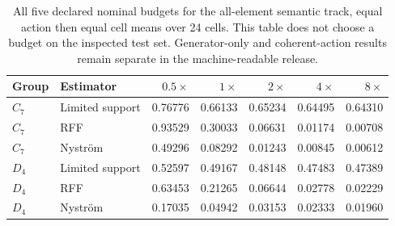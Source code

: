 \begin{table}[htbp]\centering\small
\begin{tabular}{llrrrrr}\toprule
Group & Estimator & $0.5\times$ & $1\times$ & $2\times$ & $4\times$ & $8\times$ \\
\midrule
$C_7$ & Limited support & 0.76776 & 0.66133 & 0.65234 & 0.64495 & 0.64310 \\
$C_7$ & RFF & 0.93529 & 0.30033 & 0.06631 & 0.01174 & 0.00708 \\
$C_7$ & Nystr\"om & 0.49296 & 0.08292 & 0.01243 & 0.00845 & 0.00612 \\
$D_4$ & Limited support & 0.52597 & 0.49167 & 0.48148 & 0.47483 & 0.47389 \\
$D_4$ & RFF & 0.63453 & 0.21265 & 0.06644 & 0.02778 & 0.02229 \\
$D_4$ & Nystr\"om & 0.17035 & 0.04942 & 0.03153 & 0.02333 & 0.01960 \\
\bottomrule\end{tabular}
\caption{All five declared nominal budgets for the all-element semantic track, equal action then equal cell means over 24 cells. This table does not choose a budget on the inspected test set. Generator-only and coherent-action results remain separate in the machine-readable release.}
\label{tab:reproduction-budgets}\end{table}
